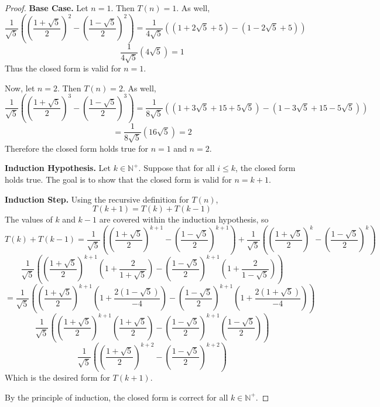 \documentclass[11pt]{article}
\begin{document}
\begin{enumerate}[label=(\alph*)]
\begin{proof}
            \textbf{Base Case.} Let \(n=1\). Then \(T(n) = 1\). As well,
            \[
                \frac{1}{\sqrt{5}}\left(\left(\frac{1+\sqrt{5}}{2}\right)^{2} - \left(\frac{1-\sqrt{5}}{2}\right)^{2}\right) = \frac{1}{4\sqrt{5}}((1+2\sqrt{5} +5) - (1-2\sqrt{5} +5))
            \]
            \[
                \frac{1}{4\sqrt{5}}(4\sqrt{5}) = 1
            \]
            Thus the closed form is valid for \(n=1\).

            Now, let \(n=2\). Then \(T(n)=2\). As well,
            \[
                \frac{1}{\sqrt{5}}\left(\left(\frac{1+\sqrt{5}}{2}\right)^{3} - \left(\frac{1-\sqrt{5}}{2}\right)^{3}\right) = \frac{1}{8\sqrt{5}}((1+3\sqrt{5} + 15 + 5\sqrt{5}) - (1 - 3\sqrt{5} + 15 - 5\sqrt{5}))
            \]
            \[
                = \frac{1}{8\sqrt{5}}(16\sqrt{5}) = 2
            \]
            Therefore the closed form holds true for \(n=1\) and \(n=2\).

            \textbf{Induction Hypothesis.} Let \(k \in \mathbb{N}^+\). Suppose that for all \(i \leq k\), the closed form holds true. The goal is to show that the closed form is valid for \(n=k+1\).

            \textbf{Induction Step.} Using the recursive definition for \(T(n)\),
            \[
                T(k+1) = T(k) + T(k-1)
            \]
            The values of \(k\) and \(k-1\) are covered within the induction hypothesis, so
            \[
                T(k) + T(k-1) = \frac{1}{\sqrt{5}}\left(\left(\frac{1+\sqrt{5}}{2}\right)^{k+1} - \left(\frac{1-\sqrt{5}}{2}\right)^{k+1}\right) + \frac{1}{\sqrt{5}}\left(\left(\frac{1+\sqrt{5}}{2}\right)^{k} - \left(\frac{1-\sqrt{5}}{2}\right)^{k}\right)
            \]
            \[
                \frac{1}{\sqrt{5}}\left( \left(\frac{1+\sqrt{5}}{2}\right)^{k+1} \left( 1 + \frac{2}{1+\sqrt{5}}\right) - \left(\frac{1-\sqrt{5}}{2}\right)^{k+1} \left(1 + \frac{2}{1-\sqrt{5}} \right) \right)
            \]
            \[
                = \frac{1}{\sqrt{5}}\left( \left( \frac{1+\sqrt{5}}{2} \right)^{k+1} \left( 1 + \frac{2(1-\sqrt{5})}{-4} \right) - \left( \frac{1-\sqrt{5}}{2} \right)^{k+1} \left( 1 + \frac{2(1+\sqrt{5})}{-4}\right) \right)
            \]
            \[
                \frac{1}{\sqrt{5}}\left( \left( \frac{1+\sqrt{5}}{2} \right)^{k+1} \left(\frac{1+\sqrt{5}}{2} \right) - \left(\frac{1-\sqrt{5}}{2} \right)^{k+1} \left(\frac{1-\sqrt{5}}{2}\right)\right)
            \]
            \[
                \frac{1}{\sqrt{5}}\left( \left( \frac{1+\sqrt{5}}{2} \right)^{k+2} - \left(\frac{1-\sqrt{5}}{2} \right)^{k+2}\right)
            \]
            Which is the desired form for \(T(k+1)\).

            By the principle of induction, the closed form is correct for all \(k \in \mathbb{N}^+\).

        \end{proof}
    \end{enumerate}
\end{document}
